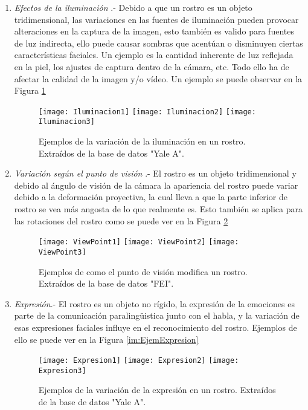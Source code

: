 \begin{enumerate}%
\item \textit{Efectos de la iluminación} \cite{kalocsai1998face} \cite{johnston1992recognising} \cite{bruce1998human} \cite{hill1996effects}.- Debido a que un rostro es un objeto tridimensional, las variaciones en las fuentes de iluminación pueden provocar alteraciones en la captura de la imagen, esto también es valido para fuentes de luz indirecta, ello puede causar sombras que acentúan o disminuyen ciertas características faciales. Un ejemplo es la cantidad inherente de luz reflejada en la piel, los ajustes de captura dentro de la cámara, etc. Todo ello ha de afectar la calidad de la imagen y/o vídeo. Un ejemplo se puede observar en la Figura \ref{im:EjemIluminacion}
\begin{figure}[h]
\center
\texttt{[image: Iluminacion1]}
\texttt{[image: Iluminacion2]}
\texttt{[image: Iluminacion3]}
\caption{Ejemplos de la variación de la iluminación en un rostro. Extraídos de la base de datos "Yale A".}
\label{im:EjemIluminacion}
\end{figure}
\item \textit{Variación según el punto de visión}  \cite{hill1997information}.- El rostro es un objeto tridimensional y debido al ángulo de visión de la cámara la apariencia del rostro puede variar debido a la deformación proyectiva, la cual lleva a que la parte inferior de rostro se vea más angosta de lo que realmente es. Esto también se aplica para las rotaciones del rostro como se puede ver en la Figura \ref{im:EjemViewPoint}
\begin{figure}[h]
\center
\texttt{[image: ViewPoint1]}
\texttt{[image: ViewPoint2]}
\texttt{[image: ViewPoint3]}
\caption{Ejemplos de como el punto de visión modifica un rostro. Extraídos de la base de datos "FEI".}
\label{im:EjemViewPoint}
\end{figure}
\item \textit{Expresión}.-  El rostro es un objeto no rígido, la expresión de la emociones es parte de la comunicación paralingüistica junto con el habla, y la variación de esas expresiones faciales influye en el reconocimiento del rostro. Ejemplos de ello se puede ver en la Figura \ref{im:EjemExpresion}
\begin{figure}[h]
\center
\texttt{[image: Expresion1]}
\texttt{[image: Expresion2]}
\texttt{[image: Expresion3]}
\caption{Ejemplos de la variación de la expresión en un rostro. Extraídos de la base de datos "Yale A".}

\end{figure}
\end{enumerate}
